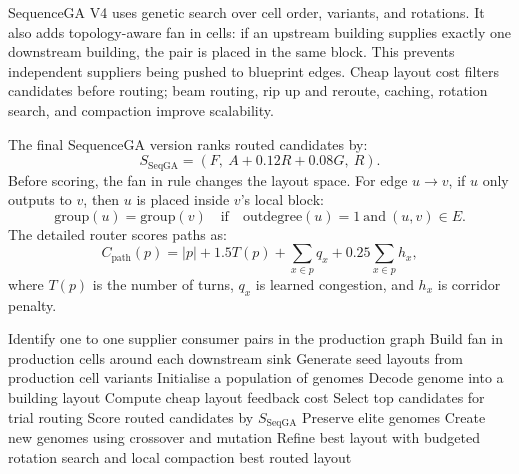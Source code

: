 \documentclass[11pt,a4paper]{article}
\begin{document}
SequenceGA V4 uses genetic search over cell order, variants, and rotations. It also adds topology-aware fan in cells: if an upstream building supplies exactly one downstream building, the pair is placed in the same block. This prevents independent suppliers being pushed to blueprint edges. Cheap layout cost filters candidates before routing; beam routing, rip up and reroute, caching, rotation search, and compaction improve scalability.

The final SequenceGA version ranks routed candidates by:
\begin{equation}
S_{\mathrm{SeqGA}} = \left(F,\ A+0.12R+0.08G,\ R\right).
\end{equation}
Before scoring, the fan in rule changes the layout space. For edge $u \rightarrow v$, if $u$ only outputs to $v$, then $u$ is placed inside $v$'s local block:
\begin{equation}
\mathrm{group}(u)=\mathrm{group}(v)\quad \text{if}\quad \mathrm{outdegree}(u)=1\ \text{and}\ (u,v)\in E.
\end{equation}
The detailed router scores paths as:
\begin{equation}
C_{\mathrm{path}}(p)=|p|+1.5T(p)+\sum_{x\in p}q_x+0.25\sum_{x\in p}h_x,
\end{equation}
where $T(p)$ is the number of turns, $q_x$ is learned congestion, and $h_x$ is corridor penalty.

\begin{algorithm}[H]
    \caption{Genetic production-cell layout search}
    \label{alg:ga-layout}
    \begin{algorithmic}[1]
        \State Identify one to one supplier consumer pairs in the production graph
        \State Build fan in production cells around each downstream sink
        \State Generate seed layouts from production cell variants
        \State Initialise a population of genomes
                \State Decode genome into a building layout
                \State Compute cheap layout feedback cost
            \EndFor
            \State Select top candidates for trial routing
            \State Score routed candidates by $S_{\mathrm{SeqGA}}$
            \State Preserve elite genomes
            \State Create new genomes using crossover and mutation
        \EndFor
        \State Refine best layout with budgeted rotation search and local compaction
        \State \Return best routed layout
    \end{algorithmic}
\end{algorithm}
\end{document}
